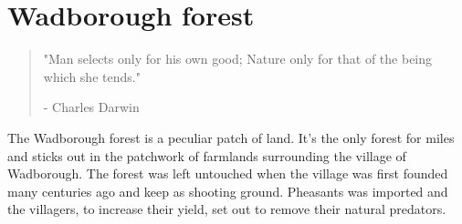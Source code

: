 \documentclass[smalldemyvopaper,11pt,twoside,onecolumn,openright,extrafontsizes]{memoir}
\begin{document}











\mainmatter
\chapter{Wadborough forest}
\vspace{-1.3cm}
\begin{localsize}{10}
	\begin{quote}
		"Man selects only for his own good; Nature only for that of the being which she tends."
		\begin{flushright}- Charles Darwin\end{flushright}
	\end{quote} 
\end{localsize}
\vspace{1cm}

The Wadborough forest is a peculiar patch of land. It's the only forest for miles and sticks out in the patchwork of farmlands surrounding the village of Wadborough. The forest was left untouched when the village was first founded many centuries ago and keep as shooting ground. Pheasants was imported and the villagers, to increase their yield, set out to remove their natural predators. \\
\end{document}
